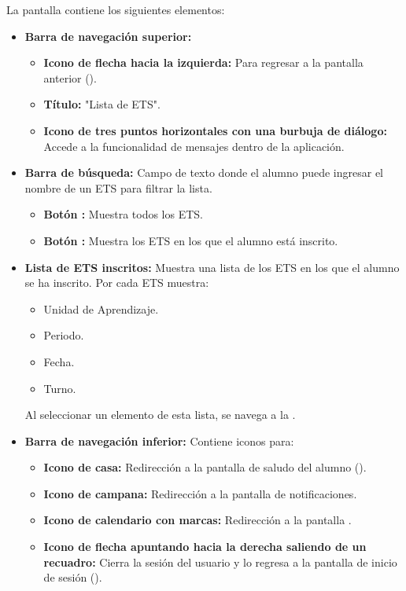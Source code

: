 La pantalla contiene los siguientes elementos:
\begin{itemize}
	\item \textbf{Barra de navegación superior:}
	\begin{itemize}
		\item \textbf{Icono de flecha hacia la izquierda:} Para regresar a la pantalla anterior ().
		\item \textbf{Título:} "Lista de ETS".
		\item \textbf{Icono de tres puntos horizontales con una burbuja de diálogo:} Accede a la funcionalidad de mensajes dentro de la aplicación.
	\end{itemize}
	\item \textbf{Barra de búsqueda:} Campo de texto donde el alumno puede ingresar el nombre de un ETS para filtrar la lista.
	\begin{itemize}
		\item \textbf{Botón :} Muestra todos los ETS.
		\item \textbf{Botón :} Muestra los ETS en los que el alumno está inscrito.
	\end{itemize}
	\item \textbf{Lista de ETS inscritos:} Muestra una lista de los ETS en los que el alumno se ha inscrito. Por cada ETS muestra:
	\begin{itemize}
		\item Unidad de Aprendizaje.
		\item Periodo.
		\item Fecha.
		\item Turno.
	\end{itemize}
	Al seleccionar un elemento de esta lista, se navega a la .
	\item \textbf{Barra de navegación inferior:} Contiene iconos para:
	\begin{itemize}
		\item \textbf{Icono de casa:} Redirección a la pantalla de saludo del alumno ().
		\item \textbf{Icono de campana:} Redirección a la pantalla de notificaciones.
		\item \textbf{Icono de calendario con marcas:} Redirección a la pantalla .
		\item \textbf{Icono de flecha apuntando hacia la derecha saliendo de un recuadro:} Cierra la sesión del usuario y lo regresa a la pantalla de inicio de sesión ().
	\end{itemize}
\end{itemize}

